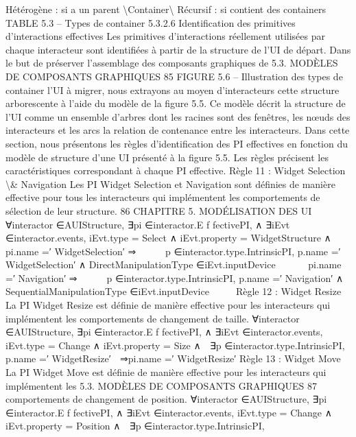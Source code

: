 \documentclass{article}
\begin{document}
H\'{e}t\'{e}rog\`{e}ne : si a un parent
\textbackslash{}{Container\textbackslash{}}
R\'{e}cursif : si contient des containers
TABLE 5.3 – Types de container
5.3.2.6
Identiﬁcation des primitives d’interactions effectives
Les primitives d’interactions r\'{e}ellement utilis\'{e}es par chaque interacteur sont identiﬁ\'{e}es \`{a} partir de
la structure de l’UI de d\'{e}part. Dans le but de pr\'{e}server l’assemblage des composants graphiques de
5.3. MODÈLES DE COMPOSANTS GRAPHIQUES
85
FIGURE 5.6 – Illustration des types de container
l’UI \`{a} migrer, nous extrayons au moyen d’interacteurs cette structure arborescente \`{a} l’aide du mod\`{e}le
de la ﬁgure 5.5. Ce mod\`{e}le d\'{e}crit la structure de l’UI comme un ensemble d’arbres dont les racines
sont des fen\^{e}tres, les nœuds des interacteurs et les arcs la relation de contenance entre les interacteurs.
Dans cette section, nous pr\'{e}sentons les r\`{e}gles d’identiﬁcation des PI effectives en fonction du
mod\`{e}le de structure d’une UI pr\'{e}sent\'{e} \`{a} la ﬁgure 5.5. Les r\`{e}gles pr\'{e}cisent les caract\'{e}ristiques correspondant \`{a} chaque PI effective.
R\`{e}gle 11 : Widget Selection \textbackslash{}& Navigation
Les PI Widget Selection et Navigation sont d\'{e}ﬁnies de mani\`{e}re effective pour tous les interacteurs
qui impl\'{e}mentent les comportements de s\'{e}lection de leur structure.
86
CHAPITRE 5. MODÉLISATION DES UI
∀interactor ∈AUIStructure, ∃pi ∈interactor.E f fectivePI,
∧
∃iEvt ∈interactor.events, iEvt.type = Select
∧
iEvt.property = WidgetStructure
∧
pi.name =′ WidgetSelection′ ⇒




∃p ∈interactor.type.IntrinsicPI,
p.name =′ WidgetSelection′
∧
DirectManipulationType ∈iEvt.inputDevice




∧
pi.name =′ Navigation′ ⇒




∃p ∈interactor.type.IntrinsicPI,
p.name =′ Navigation′
∧
SequentialManipulationType ∈iEvt.inputDevice




R\`{e}gle 12 : Widget Resize
La PI Widget Resize est d\'{e}ﬁnie de mani\`{e}re effective pour les interacteurs qui impl\'{e}mentent les
comportements de changement de taille.
∀interactor ∈AUIStructure, ∃pi ∈interactor.E f fectivePI,
∧
∃iEvt ∈interactor.events, iEvt.type = Change
∧
iEvt.property = Size
∧
 ∃p ∈interactor.type.IntrinsicPI,
p.name =′ WidgetResize′

⇒pi.name =′ WidgetResize′
R\`{e}gle 13 : Widget Move
La PI Widget Move est d\'{e}ﬁnie de mani\`{e}re effective pour les interacteurs qui impl\'{e}mentent les
5.3. MODÈLES DE COMPOSANTS GRAPHIQUES
87
comportements de changement de position.
∀interactor ∈AUIStructure,
∃pi ∈interactor.E f fectivePI,
∧
∃iEvt ∈interactor.events,
iEvt.type = Change
∧
iEvt.property = Position
∧
 ∃p ∈interactor.type.IntrinsicPI,
\end{document}
